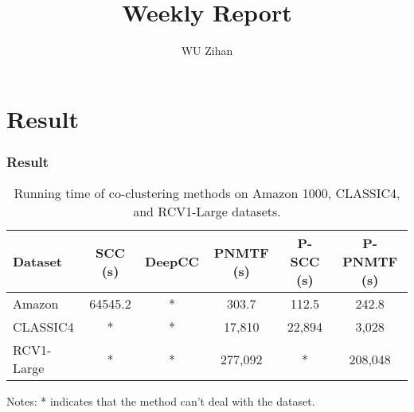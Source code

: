 \documentclass{beamer}
\title{Weekly Report}
\author{WU Zihan}
\begin{document}
\maketitle




\section{Result}
\begin{frame}
  \fontsize{6pt}{8}\selectfont

  \frametitle{Result}
  \begin{table}[htbp]
    \centering
    \caption{Running time of co-clustering methods on Amazon 1000, CLASSIC4, and RCV1-Large datasets.}
    \begin{tabular}{@{} l ccccc @{}}
      \toprule
      Dataset    & SCC (s) & DeepCC & PNMTF (s) & P-SCC (s) & P-PNMTF (s) \\
      \midrule
      Amazon     & 64545.2 & *      & 303.7     & 112.5     & 242.8       \\
      CLASSIC4   & *       & *      & 17,810    & 22,894    & 3,028       \\
      RCV1-Large & *       & *      & 277,092   & *         & 208,048     \\
      \bottomrule
    \end{tabular}
    \begin{tablenotes}
      \item Notes: * indicates that the method can't deal with the dataset.
    \end{tablenotes}
  \end{table}


\end{frame}
\end{document}
